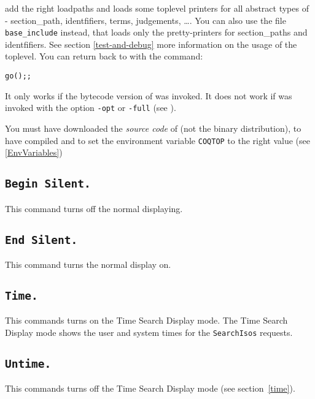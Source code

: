 \noindent add the right loadpaths and loads some toplevel printers for
all abstract types of \Coq - section\_path, identfifiers, terms, judgements,
\dots. You can also use the file \texttt{base\_include} instead,
that loads only the pretty-printers for section\_paths and
identfifiers. See section \ref{test-and-debug} more information on the
usage of the toplevel. You can return back to \Coq{} with the command: 

\begin{flushleft}
\begin{verbatim}
go();;
\end{verbatim}
\end{flushleft}

\begin{Warnings}
\item It only works if the bytecode version of {\Coq} was
invoked. It does not work if {\Coq} was invoked with the option 
{\tt -opt} or {\tt -full} (see \pageref{binary-images}).
\item You must have downloaded the \emph{source code} of \Coq{} (not the
  binary distribution), to have compiled \Coq{} and to set the
  environment variable \texttt{COQTOP} to the right value (see
  \ref{EnvVariables})
\end{Warnings}

\subsection{\tt Begin Silent.}
\label{Begin-Silent}
This command turns off the normal displaying.

\subsection{\tt End Silent.}
This command turns the normal display on.

\subsection{\tt Time.}
\label{time}
This commands turns on the Time Search Display mode. The Time Search Display
mode shows the user and system times for the {\tt SearchIsos} requests.

\subsection{\tt Untime.}
This commands turns off the Time Search Display mode (see section~\ref{time}).





